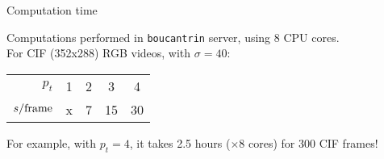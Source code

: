 \documentclass[mathserif, 8pt]{beamer}
\makeatletter
\newcounter{multipleslide}
\newcommand{\restoreframe}{%
\patchcmd{\beamer@@tmpl@footline}%
	{\themultipleslide}%
	{\insertframenumber}%
	{}%
	{}%
\setcounter{framenumber}{\value{multipleslide}}%
}
\makeatother
\begin{document}
\restoreframe

\begin{frame}{Computation time}

	Computations performed in \texttt{boucantrin} server, using 8 CPU cores.\\
	For CIF (352x288) RGB videos, with $\sigma = 40$: 

	\bigskip

	\begin{center}
	\begin{tabular}{r | c c c c}
		$p_t$ & 1 & 2 & 3 & 4 \\
		$s/\textnormal{frame}$ & x & 7 & 15 & 30 \\
	\end{tabular}
	\end{center}

	\vspace{2cm}

	For example, with $p_t = 4$, it takes 2.5 hours ($\times 8$ cores) for 300 CIF frames!

\end{frame}
% 
% 
\end{document}
